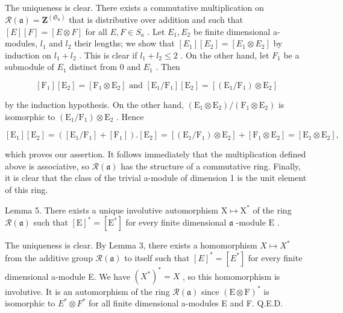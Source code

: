 The uniqueness is clear. There exists a commutative multiplication on \(\mathcal{R}(\mathfrak{a}) = \mathbf{Z}^{(\mathfrak{S}_{\mathfrak{a}})}\) that is distributive over addition and such that \([E][F] = [E \otimes F]\) for all \(E, F \in S_{a}\) . Let \(E_{1}, E_{2}\) be finite dimensional a-modules, \(l_{1}\) and \(l_{2}\) their lengths; we show that \([E_{1}][E_{2}] = [E_{1} \otimes E_{2}]\) by induction on \(l_{1} + l_{2}\) . This is clear if \(l_{1} + l_{2} \leq 2\) . On the other hand, let \(F_{1}\) be a submodule of \(E_{1}\) distinct from 0 and \(E_{1}\) . Then

\[
[ \mathrm{F} _ {1} ] [ \mathrm{E} _ {2} ] = [ \mathrm{F} _ {1} \otimes \mathrm{E} _ {2} ] \text { and } [ \mathrm{E} _ {1} / \mathrm{F} _ {1} ] [ \mathrm{E} _ {2} ] = [ (\mathrm{E} _ {1} / \mathrm{F} _ {1}) \otimes \mathrm{E} _ {2} ]
\]

by the induction hypothesis. On the other hand, \((\mathrm{E}_1\otimes \mathrm{E}_2) / (\mathrm{F}_1\otimes \mathrm{E}_2)\) is isomorphic to \((\mathrm{E}_1 / \mathrm{F}_1)\otimes \mathrm{E}_2\) . Hence

\[
[ \mathrm{E} _ {1} ] [ \mathrm{E} _ {2} ] = ([ \mathrm{E} _ {1} / \mathrm{F} _ {1} ] + [ \mathrm{F} _ {1} ]). [ \mathrm{E} _ {2} ] = [ (\mathrm{E} _ {1} / \mathrm{F} _ {1}) \otimes \mathrm{E} _ {2} ] + [ \mathrm{F} _ {1} \otimes \mathrm{E} _ {2} ] = [ \mathrm{E} _ {1} \otimes \mathrm{E} _ {2} ],
\]

which proves our assertion. It follows immediately that the multiplication defined above is associative, so \(\mathcal{R}(\mathfrak{a})\) has the structure of a commutative ring. Finally, it is clear that the class of the trivial a-module of dimension 1 is the unit element of this ring.

Lemma 5. There exists a unique involutive automorphism \(\mathrm{X} \mapsto \mathrm{X}^*\) of the ring \(\mathcal{R}(\mathfrak{a})\) such that \([\mathrm{E}]^* = [\mathrm{E}^*]\) for every finite dimensional \(\mathfrak{a}\) -module \(\mathrm{E}\) .

The uniqueness is clear. By Lemma 3, there exists a homomorphism \(X \mapsto X^{*}\) from the additive group \(\mathcal{R}(\mathfrak{a})\) to itself such that \([E]^{*} = [E^{*}]\) for every finite dimensional a-module E. We have \((X^{*})^{*} = X\) , so this homomorphism is involutive. It is an automorphism of the ring \(\mathcal{R}(\mathfrak{a})\) since \((\mathrm{E} \otimes \mathrm{F})^{*}\) is isomorphic to \(E^{*} \otimes F^{*}\) for all finite dimensional a-modules E and F. Q.E.D.


